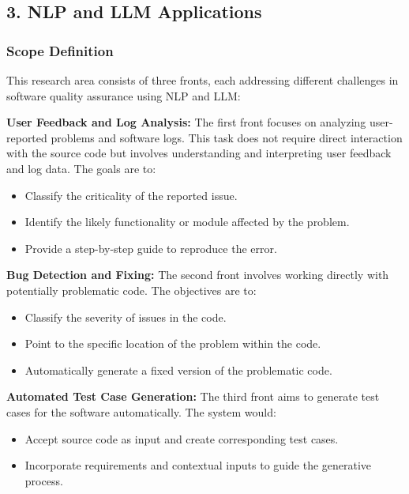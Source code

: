 \documentclass[12pt]{article}
\begin{document}
\subsection*{3. NLP and LLM Applications}

\subsubsection*{Scope Definition}

This research area consists of three fronts, each addressing different challenges in software quality assurance using NLP and LLM:

\textbf{User Feedback and Log Analysis:} The first front focuses on analyzing user-reported problems and software logs. This task does not require direct interaction with the source code but involves understanding and interpreting user feedback and log data. The goals are to:

\begin{itemize}
    \item Classify the criticality of the reported issue.
    \item Identify the likely functionality or module affected by the problem.
    \item Provide a step-by-step guide to reproduce the error.
\end{itemize}

\textbf{Bug Detection and Fixing:} The second front involves working directly with potentially problematic code. The objectives are to:

\begin{itemize}
    \item Classify the severity of issues in the code.
    \item Point to the specific location of the problem within the code.
    \item Automatically generate a fixed version of the problematic code.
\end{itemize}

\textbf{Automated Test Case Generation:} The third front aims to generate test cases for the software automatically. The system would:

\begin{itemize}
    \item Accept source code as input and create corresponding test cases.
    \item Incorporate requirements and contextual inputs to guide the generative process.
\end{itemize}
\end{document}
